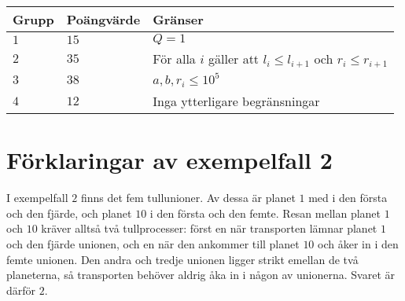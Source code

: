 \noindent
\begin{tabular}{| l | l | l |}
  \hline
  Grupp & Poängvärde & Gränser \\ \hline
  $1$   & $15$        & $Q=1$  \\ \hline
  $2$   & $35$        & För alla $i$ gäller att $l_i \le l_{i + 1}$ och $r_i \le r_{i+1}$ \\ \hline
  $3$   & $38$       & $ a,b,r_i \leq 10^5$ \\ \hline
  $4$   & $12$       & Inga ytterligare begränsningar \\ \hline
\end{tabular}

\section*{Förklaringar av exempelfall 2}
I exempelfall $2$ finns det fem tullunioner.
Av dessa är planet $1$ med i den första och den fjärde, och planet $10$ i den första och den femte.
Resan mellan planet $1$ och $10$ kräver alltså två tullprocesser: först en när transporten lämnar planet $1$ och den fjärde unionen, och en när den ankommer till planet $10$ och åker in i den femte unionen.
Den andra och tredje unionen ligger strikt emellan de två planeterna, så transporten behöver aldrig åka in i någon av unionerna.
Svaret är därför $2$.
